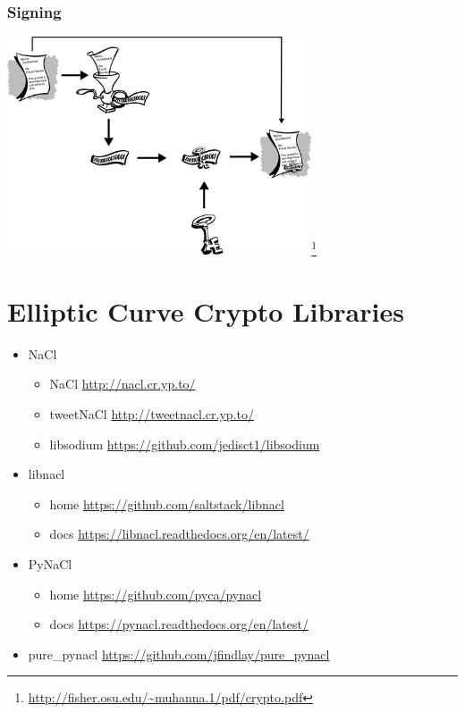 \documentclass{beamer}
\begin{document}
\begin{frame}
\frametitle{Signing}
\begin{center}
  \includegraphics[width=9cm]{signing.png}\footnote{\url{http://fisher.osu.edu/~muhanna.1/pdf/crypto.pdf}}
\end{center}
\end{frame}

\section{Elliptic Curve Crypto Libraries}

\begin{frame}
\begin{itemize}
  \item NaCl
    \begin{itemize}
      \item NaCl \url{http://nacl.cr.yp.to/}
      \item tweetNaCl \url{http://tweetnacl.cr.yp.to/}
      \item libsodium \url{https://github.com/jedisct1/libsodium}
    \end{itemize}
  \item libnacl
    \begin{itemize}
      \item home \url{https://github.com/saltstack/libnacl}
      \item docs \url{https://libnacl.readthedocs.org/en/latest/}
    \end{itemize}
  \item PyNaCl
    \begin{itemize}
      \item home \url{https://github.com/pyca/pynacl}
      \item docs \url{https://pynacl.readthedocs.org/en/latest/}
    \end{itemize}
  \item pure\_pynacl \url{https://github.com/jfindlay/pure\_pynacl}
\end{itemize}
\end{frame}
\end{document}
